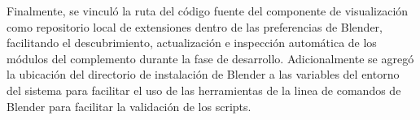 Finalmente, se vinculó la ruta del código fuente del componente de visualización como repositorio local
de extensiones dentro de las preferencias de Blender, facilitando el descubrimiento, actualización e inspección 
automática de los módulos del complemento durante la fase de desarrollo. Adicionalmente se agregó
la ubicación del directorio de instalación de Blender a las variables del entorno del sistema para
facilitar el uso de las herramientas de la linea de comandos de Blender para facilitar la
validación de los scripts.

